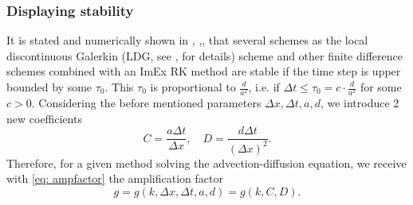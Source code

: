 \subsubsection{Displaying stability}
It is stated and numerically shown in \cite{TanChenShu_ImEx_Stability}, \cite{WangShuZhang_LDG1_2015},\cite{WangShuZhang_LDG_2016}, that several schemes as the local discontinuous Galerkin (LDG, see \cite{WangShuZhang_LDG1_2015},\cite{WangShuZhang_LDG_2016} for details) scheme and other finite difference schemes combined with an ImEx RK method are stable if the time step is upper bounded by some $\tau_0$. This $\tau_0$ is proportional to $\frac{d}{a^2}$, i.e. if $\Delta t\le\tau_0= c\cdot \frac{d}{a^2}$ for some $c>0$.
Considering the before mentioned parameters $\Delta x, \Delta t, a,d$, we introduce 2 new coefficients
\begin{equation}
C=\frac{a\Delta t}{\Delta x}, \quad D=\frac{d\Delta t}{{(\Delta x)}^2}.
\end{equation}
Therefore, for a given method solving the advection-diffusion equation, we receive  with \eqref{eq: ampfactor} the amplification factor
\begin{equation}
g=g(k,\Delta x, \Delta t, a,d)=g(k,C,D).
\end{equation}


